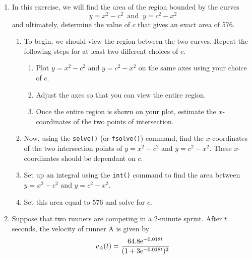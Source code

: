 \begin{enumerate}
    \item In this exercise, we will find the area of the region bounded by the curves 
    \[ y = x^2 - c^2 \;\; \text{and} \;\; y = c^2 - x^2 \] 
    and ultimately, determine the value of $c$ that gives an exact area of 576.
    \begin{enumerate}
        \item To begin, we should view the region between the two curves. Repeat the following steps for at least two different choices of $c$.
        \begin{enumerate}
            \item Plot $y = x^2 - c^2$ and $y=c^2 - x^2$ on the same axes using your choice of $c$.
            \item Adjust the axes so that you can view the entire region.
            \item Once the entire region is shown on your plot, estimate the $x$-coordinates of the two points of intersection.
        \end{enumerate}
        \item Now, using the \texttt{solve()} (or \texttt{fsolve()}) command, find the $x$-coordinates of the two intersection points of $y = x^2 - c^2$ and $y = c^2 - x^2$. These $x$-coordinates should be dependant on $c$.
        \item Set up an integral using the \texttt{int()} command to find the area between $y = x^2 - c^2$ and $y = c^2 - x^2$.
        \item Set this area equal to $576$ and solve for $c$.
    \end{enumerate}
    \item Suppose that two runners are competing in a $2$-minute sprint. After $t$ seconds, the velocity of runner A is given by 
    \[ v_A(t) = \frac{64.8 {\rm e}^{-0.018t}}{(1 + 3{\rm e}^{-0.018t})^2}\]

\end{enumerate}
